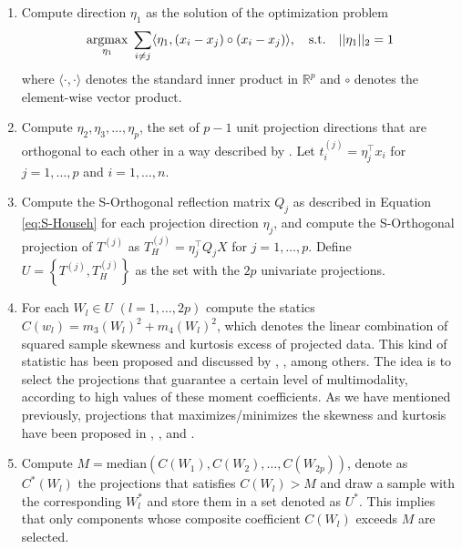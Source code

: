 \documentclass[12pt]{article}
\DeclareMathOperator*{\argmax}{argmax}
\begin{document}
\begin{enumerate}
    \item Compute direction $\eta_1$ as the solution of the optimization problem
    \begin{equation*}
            \argmax_{\eta_1}\; \sum_{i\neq j}\langle \eta_1, (x_i-x_j)\circ(x_i-x_j)\rangle,\quad\text{s.t.}\quad ||\eta_1||_2 = 1\\
    \end{equation*}
        where $\langle \cdot,\cdot\rangle$ denotes the standard inner product in $\mathbb{R}^p$ and $\circ$ denotes the element-wise vector product.
            
    \item Compute $\eta_2, \eta_3, \dots, \eta_p$, the set of $p-1$ unit projection directions that are orthogonal to each other in a way described by \citet{Kandanaarachchi2021}. Let $t^{(j)}_i = \eta_j^\top x_i$ for $j=1, \dots, p$ and $i=1, \dots, n$.
    

    \item Compute the S-Orthogonal reflection matrix $Q_j$ as described in Equation \eqref{eq:S-Househ} for each projection direction $\eta_j$, and compute the S-Orthogonal projection of $T^{(j)}$ as $T^{(j)}_H = \eta_j^\top Q_j X$ for $j = 1, \dots, p$. Define $U = \left\{ T^{(j)}, T^{(j)}_H \right\}$ as the set with the $2p$ univariate projections.


    \item For each $W_l\in U$ $(l=1,\dots,2p)$ compute the statics $C(w_l)= m_3(W_l)^2+m_4(W_l)^2$, which denotes the linear combination of squared sample skewness and kurtosis excess of projected data. This kind of statistic has been proposed and discussed by \citet{DAgostino1973}, \citet{Jones1987}, among others. The idea is to select the projections that guarantee a certain level of multimodality, according to high values of these moment coefficients. As we have mentioned previously, projections that maximizes/minimizes the skewness and kurtosis have been proposed in \cite{PeñaPrieto2001b}, \citet{PeñaPrieto2007}, \citet{Loperfido2018} and \citet{Ortiz2019}.

    \item Compute $M=\text{median}(C(W_1),C(W_2),\dots,C(W_{2p}))$, denote as $C^*(W_l)$ the projections that satisfies $C(W_l)>M$ and draw a sample with the corresponding $W^*_l$ and store them in a set denoted as $U^*$. This implies that only components whose composite coefficient $C(W_l)$ exceeds $M$ are selected.


\end{enumerate}
\end{document}
